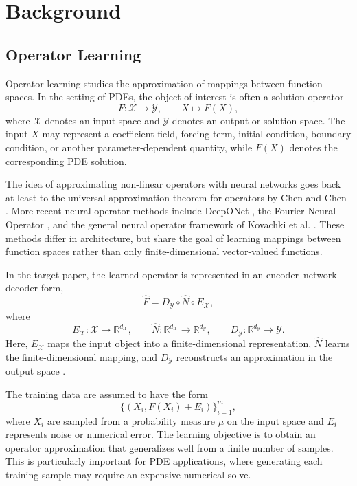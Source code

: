 \cleardoubleoddpage%
\chapter{Background}
\label{sec:background}

\section{Operator Learning}

Operator learning studies the approximation of mappings between function spaces. In the setting of PDEs, the object of interest is often a solution operator
\[
    F : \mathcal{X} \to \mathcal{Y},
    \qquad X \mapsto F(X),
\]
where $\mathcal{X}$ denotes an input space and $\mathcal{Y}$ denotes an output or solution space. The input $X$ may represent a coefficient field, forcing term, initial condition, boundary condition, or another parameter-dependent quantity, while $F(X)$ denotes the corresponding PDE solution.

The idea of approximating non-linear operators with neural networks goes back at least to the universal approximation theorem for operators by Chen and Chen \cite{chen1995universal}. More recent neural operator methods include DeepONet \cite{lu2021deeponet}, the Fourier Neural Operator \cite{li2021fno}, and the general neural operator framework of Kovachki et al. \cite{kovachki2023neuraloperator}. These methods differ in architecture, but share the goal of learning mappings between function spaces rather than only finite-dimensional vector-valued functions.

In the target paper, the learned operator is represented in an
encoder--network--decoder form,
\[
    \widehat{F}
    =
    D_{\mathcal{Y}} \circ \widehat{N} \circ E_{\mathcal{X}},
\]
where
\[
    E_{\mathcal{X}} : \mathcal{X} \to \mathbb{R}^{d_{\mathcal{X}}},
    \qquad
    \widehat{N} : \mathbb{R}^{d_{\mathcal{X}}}
    \to \mathbb{R}^{d_{\mathcal{Y}}},
    \qquad
    D_{\mathcal{Y}} : \mathbb{R}^{d_{\mathcal{Y}}} \to \mathcal{Y}.
\]
Here, $E_{\mathcal{X}}$ maps the input object into a finite-dimensional
representation, $\widehat{N}$ learns the finite-dimensional mapping, and
$D_{\mathcal{Y}}$ reconstructs an approximation in the output space
\cite{adcock2024holomorphic}.

The training data are assumed to have the form
\[
    \{(X_i, F(X_i) + E_i)\}_{i=1}^{m},
\]
where $X_i$ are sampled from a probability measure $\mu$ on the input space and $E_i$ represents noise or numerical error. The learning objective is to obtain an operator approximation that generalizes well from a finite number of samples.
This is particularly important for PDE applications, where generating each
training sample may require an expensive numerical solve.

